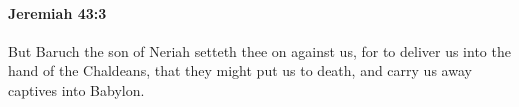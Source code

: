 
		\paragraph{Jeremiah 43:3} %
			\label{JEREMIAH-43-3}

			But Baruch the son of Neriah setteth thee on against us, for to deliver us into the hand of the Chaldeans, that they might put us to death, and carry us away captives into Babylon.


